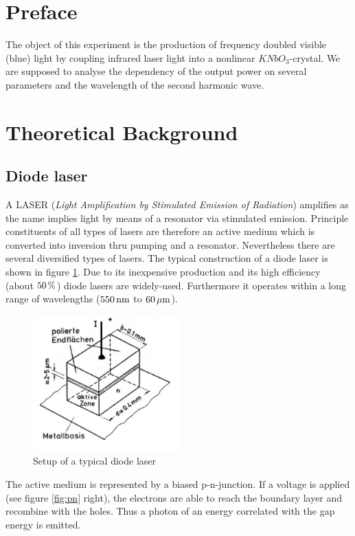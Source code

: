 \documentclass{protokoll_en}
\begin{document}
\section{Preface}
The object of this experiment is the production of frequency doubled visible (blue) light by coupling infrared laser light into a nonlinear $KNbO_3$-crystal. We are supposed to analyse the dependency of the output power on several parameters and the wavelength of the second harmonic wave.

\section{Theoretical Background}
\subsection{Diode laser}
A LASER (\emph{Light Amplification by Stimulated Emission of Radiation}) amplifies as the name implies light by means of a resonator via stimulated emission. Principle constituents of all types of lasers are therefore an active medium which is converted into inversion thru pumping and a resonator. Nevertheless there are several diversified types of lasers. The typical construction of a diode laser is shown in figure \ref{fig:laser}. Due to its inexpensive production and its high efficiency (about $\unit[50]{\%}$) diode lasers are widely-used. Furthermore it operates within a long range of wavelengths ($\unit[550]{nm}$ to $\unit[60]{\mu m}$).
\begin{figure}[H]
	\centering
		\includegraphics[width=0.5\textwidth]{graphics/laser}
	\caption{Setup of a typical diode laser~\cite{demtroed}}
	\label{fig:laser}
\end{figure}
The active medium is represented by a biased p-n-junction. If a voltage is applied (see figure \ref{fig:pn} right), the electrons are able to reach the boundary layer and recombine with the holes. Thus a photon of an energy correlated with the gap energy is emitted.
\end{document}
